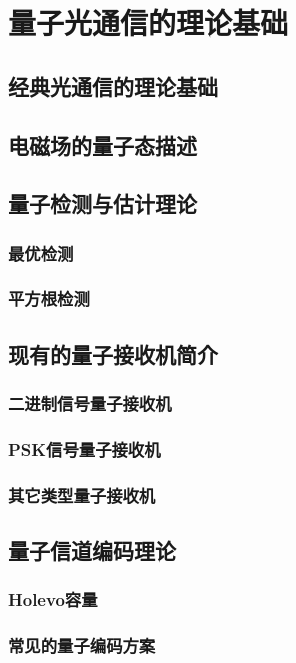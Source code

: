 \chapter{量子光通信的理论基础}

\section{经典光通信的理论基础}



\section{电磁场的量子态描述}



\section{量子检测与估计理论}

\subsection{最优检测}






\subsection{平方根检测}







\section{现有的量子接收机简介}

\subsection{二进制信号量子接收机}




\subsection{PSK信号量子接收机}





\subsection{其它类型量子接收机}






\section{量子信道编码理论}

\subsection{Holevo容量}






\subsection{常见的量子编码方案}





